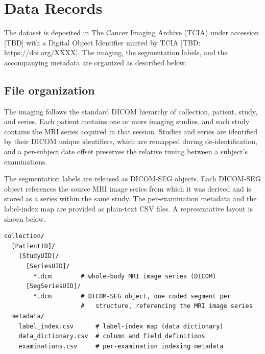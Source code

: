 
\section*{Data Records}\label{sec:datarecords}

The dataset is deposited in The Cancer Imaging Archive (TCIA) under accession [TBD] with a Digital Object Identifier minted by TCIA [TBD: https://doi.org/XXXX].
The imaging, the segmentation labels, and the accompanying metadata are organized as described below.

\subsection*{File organization}\label{subsec:layout}
The imaging follows the standard DICOM hierarchy of collection, patient, study, and series.
Each patient contains one or more imaging studies, and each study contains the MRI series acquired in that session.
Studies and series are identified by their DICOM unique identifiers, which are remapped during de-identification, and a per-subject date offset preserves the relative timing between a subject's examinations.

The segmentation labels are released as DICOM-SEG objects.
Each DICOM-SEG object references the source MRI image series from which it was derived and is stored as a series within the same study.
The per-examination metadata and the label-index map are provided as plain-text CSV files.
A representative layout is shown below.

\begin{verbatim}
collection/
  [PatientID]/
    [StudyUID]/
      [SeriesUID]/
        *.dcm        # whole-body MRI image series (DICOM)
      [SegSeriesUID]/
        *.dcm        # DICOM-SEG object, one coded segment per
                     #   structure, referencing the MRI image series
  metadata/
    label_index.csv      # label-index map (data dictionary)
    data_dictionary.csv  # column and field definitions
    examinations.csv     # per-examination indexing metadata
\end{verbatim}

